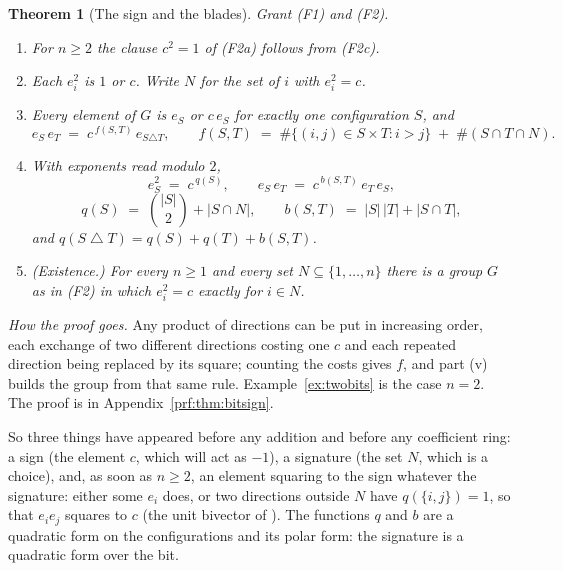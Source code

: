 \documentclass[11pt]{article}
\theoremstyle{plain}
\newtheorem{theorem}{Theorem}[section]
\theoremstyle{definition}
\theoremstyle{plain}
\theoremstyle{definition}
\begin{document}
\begin{theorem}[The sign and the blades]\label{thm:bitsign}
Grant \textup{(F1)} and \textup{(F2)}.
\begin{enumerate}
\item[(i)] For $n \geq 2$ the clause $c^{2} = 1$ of \textup{(F2a)} follows from \textup{(F2c)}.
\item[(ii)] Each $e_{i}^{2}$ is $1$ or $c$. Write $N$ for the set of $i$ with $e_{i}^{2} = c$.
\item[(iii)] Every element of $G$ is $e_{S}$ or $c\,e_{S}$ for exactly one configuration $S$, and
\[
e_{S}\,e_{T} \;=\; c^{\,f(S,T)}\,e_{S \triangle T}, \qquad
f(S,T) \;=\; \#\{(i,j) \in S \times T : i > j\} \;+\; \#(S \cap T \cap N) .
\]
\item[(iv)] With exponents read modulo $2$,
\[
e_{S}^{2} \;=\; c^{\,q(S)}, \qquad e_{S}\,e_{T} \;=\; c^{\,b(S,T)}\,e_{T}\,e_{S},
\]
\[
q(S) \;=\; \binom{|S|}{2} + |S \cap N|, \qquad b(S,T) \;=\; |S|\,|T| + |S \cap T| ,
\]
and $q(S \mathbin{\triangle} T) = q(S) + q(T) + b(S,T)$.
\item[(v)] \textup{(Existence.)} For every $n \geq 1$ and every set $N \subseteq \{1, \dots, n\}$ there is a group $G$ as in \textup{(F2)} in which $e_{i}^{2} = c$ exactly for $i \in N$.
\end{enumerate}
\end{theorem}

\noindent\emph{How the proof goes.} Any product of directions can be put in increasing order, each exchange of two different directions costing one $c$ and each repeated direction being replaced by its square; counting the costs gives $f$, and part (v) builds the group from that same rule. Example~\ref{ex:twobits} is the case $n = 2$. The proof is in Appendix~\ref{prf:thm:bitsign}.

So three things have appeared before any addition and before any coefficient ring: a sign (the element $c$, which will act as $-1$), a signature (the set $N$, which is a choice), and, as soon as $n \geq 2$, an element squaring to the sign whatever the signature: either some $e_{i}$ does, or two directions outside $N$ have $q(\{i,j\}) = 1$, so that $e_{i}e_{j}$ squares to $c$ (the unit bivector of \cite[Example 2.1]{ButlerT0}). The functions $q$ and $b$ are a quadratic form on the configurations and its polar form: the signature is a quadratic form over the bit.
\end{document}
